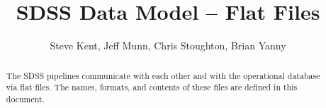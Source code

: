 \title{SDSS Data Model -- Flat Files}
%
%

\author{Steve Kent, Jeff Munn, Chris Stoughton, Brian Yanny}
\maketitle

%
\begin{abstract}
The SDSS pipelines communicate with each other and with the operational
database via flat files.  The names, formats, and contents of these
files are defined in this document.
\end{abstract}
%
\clearpage
\tableofcontents


